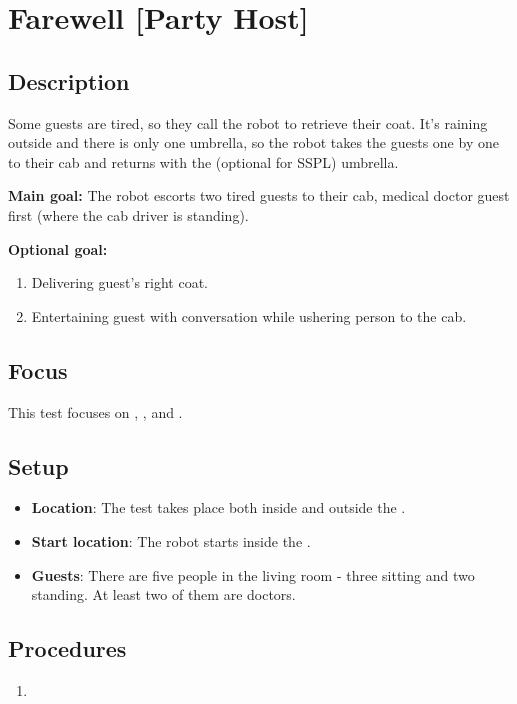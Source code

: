 \section{Farewell [Party Host]}
\label{test:farewell}

\subsection*{Description}
    Some guests are tired, so they call the robot to retrieve their coat. It's raining outside and there is only one umbrella, so the robot takes the guests one by one to their cab and returns with the (optional for SSPL) umbrella.

\textbf{Main goal:}
    The robot escorts two tired guests to their cab, medical doctor guest first (where the cab driver is standing).

\textbf{Optional goal:}
\begin{enumerate}[nosep]
	\item Delivering guest's right coat.
	\item Entertaining guest with conversation while ushering person to the cab.
\end{enumerate}

\subsection*{Focus}
This test focuses on \PerDet{}, \NAV{}, and \HRI{}.

\subsection*{Setup}
\begin{itemize}
	\item \textbf{Location}: The test takes place both inside and outside the \Arena{}.
	\item \textbf{Start location}: The robot starts inside the \Arena{}.
	\item \textbf{Guests}: There are five people in the living room - three sitting and two standing. At least two of them are doctors.
\end{itemize}

\subsection*{Procedures}
\begin{enumerate}
    \item 
\end{enumerate}

